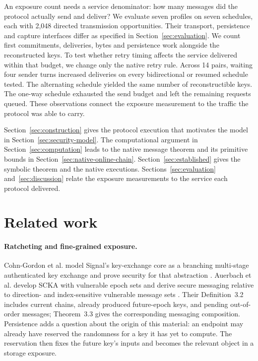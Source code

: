 \documentclass[pdflatex]{sn-jnl}
\theoremstyle{thmstyleone}
\theoremstyle{thmstylethree}
\theoremstyle{thmstyletwo}
\begin{document}
An exposure count needs a service denominator: how many messages did the
protocol actually send and deliver? We evaluate seven profiles on seven
schedules, each with 2,048 directed transmission opportunities. Their
transport, persistence and capture interfaces differ as specified in
Section~\ref{sec:evaluation}. We count first commitments, deliveries, bytes and
persistence work alongside the reconstructed keys. To test whether retry
timing affects the service delivered within that budget, we change only
the native retry rule. Across 14 pairs, waiting four sender turns
increased deliveries on every bidirectional or resumed schedule tested.
The alternating schedule yielded the same number of reconstructible
keys. The one-way schedule exhausted the send budget and left the
remaining requests queued. These observations connect the exposure
measurement to the traffic the protocol was able to carry.

Section~\ref{sec:construction} gives the protocol execution that
motivates the model in Section~\ref{sec:security-model}. The computational
argument in Section~\ref{sec:computation} leads to the native message
theorem and its primitive bounds in Section~\ref{sec:native-online-chain}.
Section~\ref{sec:established} gives the symbolic theorem and the native
executions. Sections~\ref{sec:evaluation} and~\ref{sec:discussion}
relate the exposure measurements to the service each protocol delivered.
\section{Related work}
\label{sec:related-work}

\paragraph{Ratcheting and fine-grained exposure.}
Cohn-Gordon et al. model Signal's key-exchange core as a branching multi-stage
authenticated key exchange and prove security for that abstraction
\cite{signal2020}. Auerbach et al. develop SCKA with vulnerable epoch sets and
derive secure messaging relative to direction- and index-sensitive vulnerable
message sets \cite{scka2025}. Their Definition~3.2 includes current chains,
already produced future-epoch keys, and pending out-of-order messages;
Theorem~3.3 gives the corresponding messaging composition. Persistence
adds a question about the origin of this material: an endpoint may
already have reserved the randomness for a key it has yet to compute.
The reservation then fixes the future key's inputs and becomes the
relevant object in a storage exposure.
\end{document}
